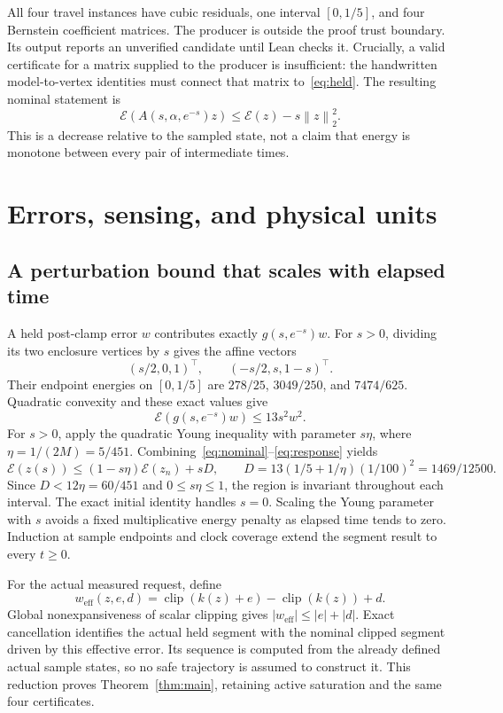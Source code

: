 \documentclass[10pt]{article}
\newcommand{\E}{\mathcal E}
\newcommand{\clip}{\operatorname{clip}}
\newcommand{\norm}[1]{\left\lVert#1\right\rVert}
\begin{document}
All four travel instances have cubic residuals, one interval $[0,1/5]$, and four Bernstein coefficient matrices. The producer is outside the proof trust boundary. Its output reports an unverified candidate until Lean checks it. Crucially, a valid certificate for a matrix supplied to the producer is insufficient: the handwritten model-to-vertex identities must connect that matrix to~\eqref{eq:held}. The resulting nominal statement is
\begin{equation}\label{eq:nominal}
 \E(A(s,\alpha,e^{-s})z)\le\E(z)-s\norm{z}_2^2.
\end{equation}
This is a decrease relative to the sampled state, not a claim that energy is monotone between every pair of intermediate times.

\section{Errors, sensing, and physical units}
\subsection{A perturbation bound that scales with elapsed time}
A held post-clamp error $w$ contributes exactly $g(s,e^{-s})w$. For $s>0$, dividing its two enclosure vertices by $s$ gives the affine vectors
\[
 (s/2,0,1)^\top,\qquad(-s/2,s,1-s)^\top.
\]
Their endpoint energies on $[0,1/5]$ are $278/25$, $3049/250$, and $7474/625$. Quadratic convexity and these exact values give
\begin{equation}\label{eq:response}
 \E(g(s,e^{-s})w)\le13s^2w^2.
\end{equation}
For $s>0$, apply the quadratic Young inequality with parameter $s\eta$, where $\eta=1/(2M)=5/451$. Combining~\eqref{eq:nominal}--\eqref{eq:response} yields
\begin{equation}\label{eq:step}
 \E(z(s))\le(1-s\eta)\E(z_n)+sD,\qquad
 D=13(1/5+1/\eta)(1/100)^2=1469/12500.
\end{equation}
Since $D<12\eta=60/451$ and $0\le s\eta\le1$, the region is invariant throughout each interval. The exact initial identity handles $s=0$. Scaling the Young parameter with $s$ avoids a fixed multiplicative energy penalty as elapsed time tends to zero. Induction at sample endpoints and clock coverage extend the segment result to every $t\ge0$.

For the actual measured request, define
\[
 w_{\mathrm{eff}}(z,e,d)=\clip(k(z)+e)-\clip(k(z))+d.
\]
Global nonexpansiveness of scalar clipping gives $|w_{\mathrm{eff}}|\le|e|+|d|$. Exact cancellation identifies the actual held segment with the nominal clipped segment driven by this effective error. Its sequence is computed from the already defined actual sample states, so no safe trajectory is assumed to construct it. This reduction proves Theorem~\ref{thm:main}, retaining active saturation and the same four certificates.
\end{document}
